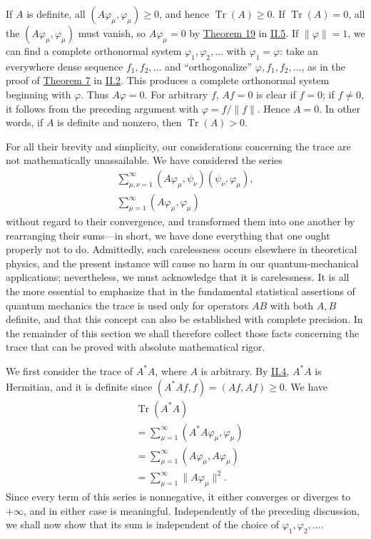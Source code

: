 \documentclass[fontsize=13pt,twoside,openany,headings=normal,parskip=false,bookmarkpackage=false,DIV=calc]{scrbook}
\begin{document}
If $A$ is definite, all $(A\varphi_\mu,\varphi_\mu)\geq0$, and hence $\operatorname{Tr}(A)\geq0$. If $\operatorname{Tr}(A)=0$, all the $(A\varphi_\mu,\varphi_\mu)$ must vanish, so $A\varphi_\mu=0$ by \hyperref[thm:II.19]{Theorem 19} in \hyperref[sec:II.5]{II.5}. If $\|\varphi\|=1$, we can find a complete orthonormal system $\varphi_1,\varphi_2,\ldots$ with $\varphi_1=\varphi$: take an everywhere dense sequence $f_1,f_2,\ldots$ and ``orthogonalize'' $\varphi,f_1,f_2,\ldots$, as in the proof of \hyperref[thm:II.7]{Theorem 7} in \hyperref[sec:II.2]{II.2}. This produces a complete orthonormal system beginning with $\varphi$. Thus $A\varphi=0$. For arbitrary $f$, $Af=0$ is clear if $f=0$; if $f\ne0$, it follows from the preceding argument with $\varphi=f/\|f\|$. Hence $A=0$. In other words, if $A$ is definite and nonzero, then $\operatorname{Tr}(A)>0$.

For all their brevity and simplicity, our considerations concerning the trace are not mathematically unassailable. We have considered the series
\begin{gather*}
\sum_{\mu,\nu=1}^\infty(A\varphi_\mu,\psi_\nu)(\psi_\nu,\varphi_\mu)
,\\
\sum_{\mu=1}^\infty(A\varphi_\mu,\varphi_\mu)
\end{gather*}
without regard to their convergence, and transformed them into one another by rearranging their sums---in short, we have done everything that one ought properly not to do. Admittedly, such carelessness occurs elsewhere in theoretical physics, and the present instance will cause no harm in our quantum-mechanical applications; nevertheless, we must acknowledge that it is carelessness. It is all the more essential to emphasize that in the fundamental statistical assertions of quantum mechanics the trace is used only for operators $AB$ with both $A,B$ definite, and that this concept can also be established with complete precision. In the remainder of this section we shall therefore collect those facts concerning the trace that can be proved with absolute mathematical rigor.

We first consider the trace of $A^*A$, where $A$ is arbitrary. By \hyperref[sec:II.4]{II.4}, $A^*A$ is Hermitian, and it is definite since $(A^*Af,f)=(Af,Af)\geq0$. We have
\begin{align*}
&\operatorname{Tr}(A^*A)\\
&=\sum_{\mu=1}^\infty(A^*A\varphi_\mu,\varphi_\mu)\\
&=\sum_{\mu=1}^\infty(A\varphi_\mu,A\varphi_\mu)\\
&=\sum_{\mu=1}^\infty\|A\varphi_\mu\|^2.
\end{align*}
Since every term of this series is nonnegative, it either converges or diverges to $+\infty$, and in either case is meaningful. Independently of the preceding discussion, we shall now show that its sum is independent of the choice of $\varphi_1,\varphi_2,\ldots$.
\end{document}
